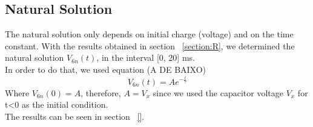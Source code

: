 \subsection{Natural Solution}
\label{section:n}
The natural solution only depends on initial charge (voltage) and on the time constant. With the results obtained in section ~\ref{section:R}, we determined the natural solution $V_{6n}(t)$, in the interval [0, 20] ms. \\
In order to do that, we used equation (A DE BAIXO)
\begin{equation}
V_{6n}(t) = Ae^{-\frac{t}{\tau}}
\end{equation}
Where $V_{6n}(0) = A$, therefore, $A=V_x$ since we used the capacitor voltage $V_x$ for t<0 as the initial condition.\\
The results can be seen in section ~\ref{}.